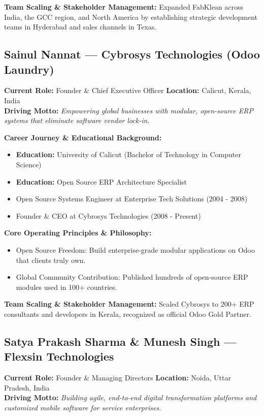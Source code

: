 \documentclass[11pt,a4paper]{article}
\begin{document}
\textbf{Team Scaling \& Stakeholder Management:} Expanded FabKlean across India, the GCC region, and North America by establishing strategic development teams in Hyderabad and sales channels in Texas.

\subsection{Sainul Nannat --- Cybrosys Technologies (Odoo Laundry)}
\textbf{Current Role:} Founder \& Chief Executive Officer \quad \textbf{Location:} Calicut, Kerala, India\\
\textbf{Driving Motto:} \textit{Empowering global businesses with modular, open-source ERP systems that eliminate software vendor lock-in.}

\textbf{Career Journey \& Educational Background:}
\begin{itemize}[leftmargin=*]
    \item \textbf{Education:} University of Calicut (Bachelor of Technology in Computer Science)
    \item \textbf{Education:} Open Source ERP Architecture Specialist
    \item Open Source Systems Engineer at Enterprise Tech Solutions (2004 - 2008)
    \item Founder \& CEO at Cybrosys Technologies (2008 - Present)
\end{itemize}

\textbf{Core Operating Principles \& Philosophy:}
\begin{itemize}[leftmargin=*]
    \item Open Source Freedom: Build enterprise-grade modular applications on Odoo that clients truly own.
    \item Global Community Contribution: Published hundreds of open-source ERP modules used in 100+ countries.
\end{itemize}

\textbf{Team Scaling \& Stakeholder Management:} Scaled Cybrosys to 200+ ERP consultants and developers in Kerala, recognized as official Odoo Gold Partner.

\subsection{Satya Prakash Sharma \& Munesh Singh --- Flexsin Technologies}
\textbf{Current Role:} Founder \& Managing Directors \quad \textbf{Location:} Noida, Uttar Pradesh, India\\
\textbf{Driving Motto:} \textit{Building agile, end-to-end digital transformation platforms and customized mobile software for service enterprises.}
\end{document}
